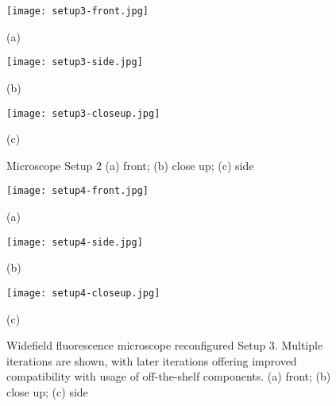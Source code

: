 \documentclass[../main.tex]{subfiles}
\begin{document}
\begin{figure}[htb]
	\begin{minipage}[t]{0.45\linewidth}\centering
		\texttt{[image: setup3-front.jpg]}
		\centerline{(a)}
	\end{minipage}
	\hfill
	\begin{minipage}[t]{0.45\linewidth}\centering
		\texttt{[image: setup3-side.jpg]}
		\centerline{(b)}
	\end{minipage}
	\begin{minipage}[t]{\linewidth}\centering
		\texttt{[image: setup3-closeup.jpg]}
		\centerline{(c)}
	\end{minipage}
	\caption{
		Microscope Setup 2 (a) front;
		(b) close up; (c) side}
	\label{fig:motion sensors}
\end{figure}

\begin{figure}[htb]
	\begin{minipage}[t]{0.32\linewidth}\centering
		\texttt{[image: setup4-front.jpg]}
		\centerline{(a)}
	\end{minipage}
	\hfill
	\begin{minipage}[t]{0.32\linewidth}\centering
		\texttt{[image: setup4-side.jpg]}
		\centerline{(b)}
	\end{minipage}
	\begin{minipage}[t]{0.32\linewidth}\centering
		\texttt{[image: setup4-closeup.jpg]}
		\centerline{(c)}
	\end{minipage}
	\caption{
		Widefield fluorescence microscope reconfigured Setup 3.
		Multiple iterations are shown, with later iterations offering improved compatibility with usage of off-the-shelf components.
		(a) front; (b) close up; (c) side}
	\label{fig:motion sensors}
\end{figure}


\clearpage
\end{document}
